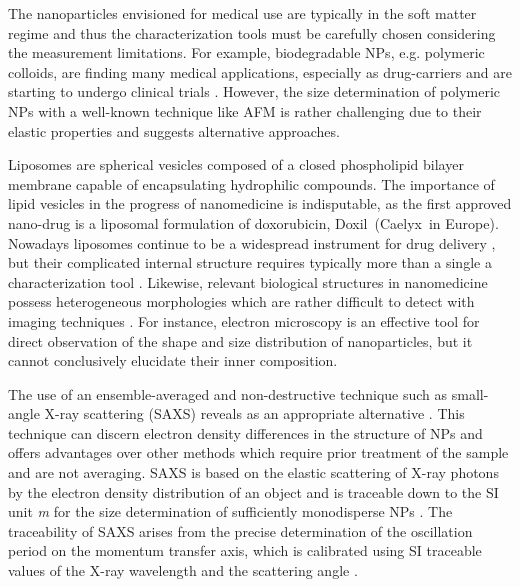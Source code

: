 The nanoparticles envisioned for medical use are typically in the soft matter regime and thus the characterization tools must be carefully chosen considering the measurement limitations. For example, biodegradable NPs, e.g. polymeric colloids, are finding many medical applications, especially as drug-carriers \citep{kattan_phase_1992,vicent_polymer_2006} and are starting to undergo clinical trials \citep{patel_polymeric_2012,beija_colloidal_2012,cabral_progress_2014}. However, the size determination of polymeric NPs with a well-known technique like AFM is rather challenging due to their elastic properties \citep{wu_particle_2014} and suggests alternative approaches.

Liposomes are spherical vesicles composed of a closed phospholipid bilayer membrane capable of encapsulating hydrophilic compounds. The importance of lipid vesicles in the progress of nanomedicine is indisputable, as the first approved nano-drug is a liposomal formulation of doxorubicin, Doxil\textregistered\ (Caelyx\textregistered\ in Europe). Nowadays liposomes continue to be a widespread instrument for drug delivery \citep{perez-herrero_advanced_2015}, but their complicated internal structure requires typically more than a single a characterization tool \citep{khorasani_closing_2014}. Likewise, relevant biological structures in nanomedicine possess heterogeneous morphologies which are rather difficult to detect with imaging techniques \citep{baumstark_structure_1990,varga_closer_2010}. For instance, electron microscopy is an effective tool for direct observation of the shape and size distribution of nanoparticles, but it cannot conclusively elucidate their inner composition.

The use of an ensemble-averaged and non-destructive technique such as small-angle X-ray scattering (SAXS) reveals as an appropriate alternative \citep{leonard_jr_size_1952,motzkus_untersuchung_1959}. This technique can discern electron density differences in the structure of NPs and offers advantages over other methods which require prior treatment of the sample and are not averaging. SAXS is based on the elastic scattering of X-ray photons by the electron density distribution of an object and is traceable down to the SI unit \emph{m} for the size determination of sufficiently monodisperse NPs \citep{meli_traceable_2012}. The traceability of SAXS arises from the precise determination of the oscillation period on the momentum transfer axis, which is calibrated using SI traceable values of the X-ray wavelength and the scattering angle \citep{krumrey_synchrotron_2011}.

